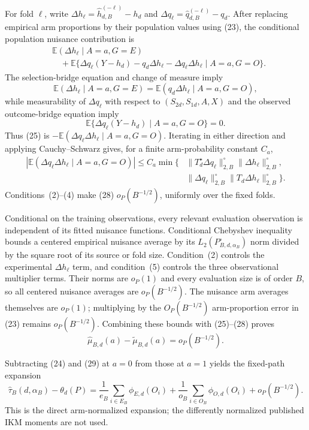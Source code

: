 For fold \(\ell\), write \(\Delta h_\ell=\widehat h_{d,B}^{(-\ell)}-h_d\) and \(\Delta q_\ell=\widehat q_{d,B}^{(-\ell)}-q_d\). After replacing empirical arm proportions by their population values using (23), the conditional population nuisance contribution is
\[
\begin{aligned}
&\mathbb E(\Delta h_\ell\mid A=a,G=E)\\
&\quad+\mathbb E\{\Delta q_\ell(Y-h_d)-q_d\Delta h_\ell
-\Delta q_\ell\Delta h_\ell\mid A=a,G=O\}. 
\end{aligned} \tag{25}
\]
The selection-bridge equation and change of measure imply
\[
\mathbb E(\Delta h_\ell\mid A=a,G=E)
=\mathbb E(q_d\Delta h_\ell\mid A=a,G=O), \tag{26}
\]
while measurability of \(\Delta q_\ell\) with respect to \((S_{2d},S_{1d},A,X)\) and the observed outcome-bridge equation imply
\[
\mathbb E\{\Delta q_\ell(Y-h_d)\mid A=a,G=O\}=0. \tag{27}
\]
Thus (25) is \(-\mathbb E(\Delta q_\ell\Delta h_\ell\mid A=a,G=O)\). Iterating in either direction and applying Cauchy--Schwarz gives, for a finite arm-probability constant \(C_a\),
\[
\begin{aligned}
|\mathbb E(\Delta q_\ell\Delta h_\ell\mid A=a,G=O)|
\le C_a\min\{&
\|T_d^\star\Delta q_\ell\|_{2,B}^{\circ}
\|\Delta h_\ell\|_{2,B}^{\circ},\\
&\|\Delta q_\ell\|_{2,B}^{\circ}
\|T_d\Delta h_\ell\|_{2,B}^{\circ}\}.
\end{aligned} \tag{28}
\]
Conditions~(2)--(4) make (28) \(o_P(B^{-1/2})\), uniformly over the fixed folds.

Conditional on the training observations, every relevant evaluation observation is independent of its fitted nuisance functions. Conditional Chebyshev inequality bounds a centered empirical nuisance average by its \(L_2(P_{B,d,\alpha_B}^{\circ})\) norm divided by the square root of its source or fold size. Condition~(2) controls the experimental \(\Delta h_\ell\) term, and condition~(5) controls the three observational multiplier terms. Their norms are \(o_P(1)\) and every evaluation size is of order \(B\), so all centered nuisance averages are \(o_P(B^{-1/2})\). The nuisance arm averages themselves are \(o_P(1)\); multiplying by the \(O_P(B^{-1/2})\) arm-proportion error in (23) remains \(o_P(B^{-1/2})\). Combining these bounds with (25)--(28) proves
\[
\widehat\mu_{B,d}(a)-\widetilde\mu_{B,d}(a)
=o_P(B^{-1/2}). \tag{29}
\]

Subtracting (24) and (29) at \(a=0\) from those at \(a=1\) yields the fixed-path expansion
\[
\widehat\tau_B(d,\alpha_B)-\theta_d(P)
=\frac1{e_B}\sum_{i\in E_B}\phi_{E,d}(O_i)
+\frac1{o_B}\sum_{i\in O_B}\phi_{O,d}(O_i)
+o_P(B^{-1/2}). \tag{30}
\]
This is the direct arm-normalized expansion; the differently normalized published IKM moments are not used.

